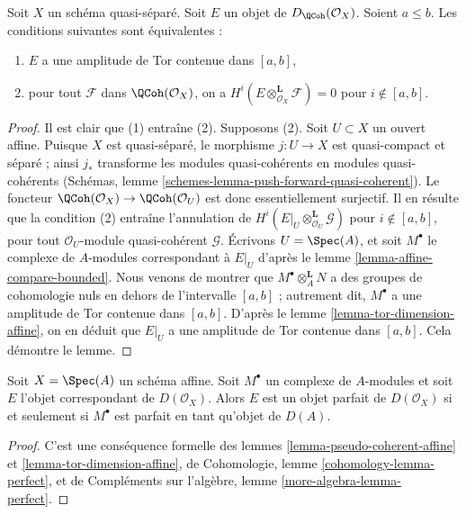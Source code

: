 \begin{lemma}
\label{lemma-tor-qc-qs}
Soit $X$ un schéma quasi-séparé. Soit $E$ un objet
de $D_\QCoh(\mathcal{O}_X)$. Soient $a \leq b$. Les
conditions suivantes sont équivalentes :
\begin{enumerate}
\item $E$ a une amplitude de Tor contenue dans $[a, b]$,
\item pour tout $\mathcal{F}$ dans $\QCoh(\mathcal{O}_X)$,
on a $H^i(E \otimes_{\mathcal{O}_X}^\mathbf{L} \mathcal{F}) = 0$
pour $i \not \in [a, b]$.
\end{enumerate}
\end{lemma}

\begin{proof}
Il est clair que (1) entraîne (2). Supposons (2). Soit $U \subset X$
un ouvert affine. Puisque $X$ est quasi-séparé, le morphisme $j : U \to X$
est quasi-compact et séparé ; ainsi $j_*$ transforme les modules quasi-cohérents
en modules quasi-cohérents
(Schémas, lemme \ref{schemes-lemma-push-forward-quasi-coherent}).
Le foncteur
$\QCoh(\mathcal{O}_X) \to \QCoh(\mathcal{O}_U)$
est donc essentiellement surjectif. Il en résulte que la condition (2)
entraîne l'annulation de
$H^i(E|_U \otimes_{\mathcal{O}_U}^\mathbf{L} \mathcal{G})$
pour $i \not \in [a, b]$, pour tout $\mathcal{O}_U$-module quasi-cohérent
$\mathcal{G}$. Écrivons $U = \Spec(A)$, et soit $M^\bullet$ le
complexe de $A$-modules correspondant à $E|_U$ d'après
le lemme \ref{lemma-affine-compare-bounded}.
Nous venons de montrer que $M^\bullet \otimes_A^\mathbf{L} N$
a des groupes de cohomologie nuls en dehors de l'intervalle $[a, b]$ ;
autrement dit, $M^\bullet$ a une amplitude de Tor contenue dans $[a, b]$.
D'après le lemme \ref{lemma-tor-dimension-affine},
on en déduit que $E|_U$ a une amplitude de Tor contenue dans $[a, b]$.
Cela démontre le lemme.
\end{proof}

\begin{lemma}
\label{lemma-perfect-affine}
Soit $X = \Spec(A)$ un schéma affine. Soit $M^\bullet$ un
complexe de $A$-modules et soit $E$ l'objet correspondant
de $D(\mathcal{O}_X)$. Alors $E$ est un objet parfait de $D(\mathcal{O}_X)$
si et seulement si $M^\bullet$ est parfait en tant qu'objet de $D(A)$.
\end{lemma}

\begin{proof}
C'est une conséquence formelle des
lemmes \ref{lemma-pseudo-coherent-affine} et
\ref{lemma-tor-dimension-affine},
de Cohomologie, lemme \ref{cohomology-lemma-perfect}, et de
Compléments sur l'algèbre, lemme \ref{more-algebra-lemma-perfect}.
\end{proof}

